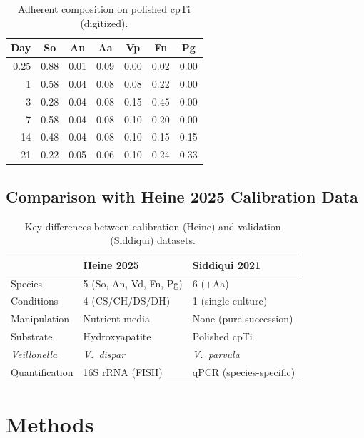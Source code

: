 \documentclass[11pt,a4paper]{article}
\begin{document}
\begin{table}[H]\centering\small
\caption{Adherent composition on polished cpTi (digitized).}
\label{tab:adh_data}
\begin{tabular}{rcccccc}
\toprule
Day & So & An & Aa & Vp & Fn & Pg \\
\midrule
0.25 & 0.88 & 0.01 & 0.09 & 0.00 & 0.02 & 0.00 \\
1    & 0.58 & 0.04 & 0.08 & 0.08 & 0.22 & 0.00 \\
3    & 0.28 & 0.04 & 0.08 & 0.15 & 0.45 & 0.00 \\
7    & 0.58 & 0.04 & 0.08 & 0.10 & 0.20 & 0.00 \\
14   & 0.48 & 0.04 & 0.08 & 0.10 & 0.15 & 0.15 \\
21   & 0.22 & 0.05 & 0.06 & 0.10 & 0.24 & 0.33 \\
\bottomrule
\end{tabular}
\end{table}

\subsection{Comparison with Heine 2025 Calibration Data}

\begin{table}[H]\centering\small
\caption{Key differences between calibration (Heine) and validation (Siddiqui) datasets.}
\label{tab:comparison}
\begin{tabular}{lll}
\toprule
 & Heine 2025 & Siddiqui 2021 \\
\midrule
Species & 5 (So, An, Vd, Fn, Pg) & 6 (+Aa) \\
Conditions & 4 (CS/CH/DS/DH) & 1 (single culture) \\
Manipulation & Nutrient media & None (pure succession) \\
Substrate & Hydroxyapatite & Polished cpTi \\
\textit{Veillonella} & \textit{V.\ dispar} & \textit{V.\ parvula} \\
Quantification & 16S rRNA (FISH) & qPCR (species-specific) \\
\bottomrule
\end{tabular}
\end{table}

\section{Methods}
\end{document}
